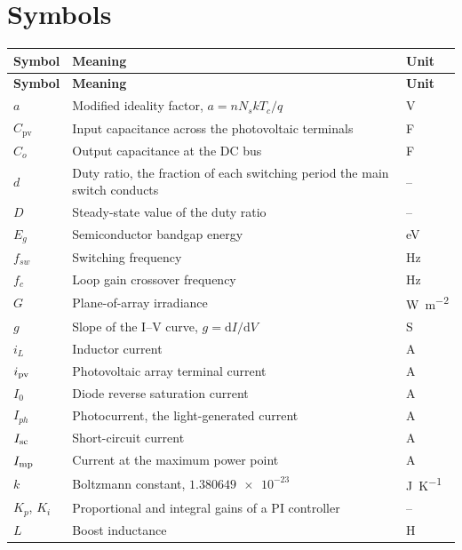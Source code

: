\section*{Symbols}

\begin{longtable}{@{}L{0.16\textwidth}L{0.62\textwidth}L{0.14\textwidth}@{}}
\toprule
\textbf{Symbol} & \textbf{Meaning} & \textbf{Unit} \\
\midrule
\endfirsthead
\toprule
\textbf{Symbol} & \textbf{Meaning} & \textbf{Unit} \\
\midrule
\endhead
\bottomrule
\endfoot

$a$ & Modified ideality factor, $a = n N_s k T_c / q$ & \si{\volt} \\
$C_{\mathrm{pv}}$ & Input capacitance across the photovoltaic terminals & \si{\farad} \\
$C_o$ & Output capacitance at the DC bus & \si{\farad} \\
$d$ & Duty ratio, the fraction of each switching period the main switch conducts & -- \\
$D$ & Steady-state value of the duty ratio & -- \\
$E_g$ & Semiconductor bandgap energy & \si{\electronvolt} \\
$f_{sw}$ & Switching frequency & \si{\hertz} \\
$f_{c}$ & Loop gain crossover frequency & \si{\hertz} \\
$G$ & Plane-of-array irradiance & \si{\watt\per\square\metre} \\
$g$ & Slope of the I--V curve, $g = \mathrm{d}I/\mathrm{d}V$ & \si{\siemens} \\
$i_L$ & Inductor current & \si{\ampere} \\
$i_{\mathrm{pv}}$ & Photovoltaic array terminal current & \si{\ampere} \\
$I_0$ & Diode reverse saturation current & \si{\ampere} \\
$I_{ph}$ & Photocurrent, the light-generated current & \si{\ampere} \\
$I_{\mathrm{sc}}$ & Short-circuit current & \si{\ampere} \\
$I_{\mathrm{mp}}$ & Current at the maximum power point & \si{\ampere} \\
$k$ & Boltzmann constant, $\num{1.380649e-23}$ & \si{\joule\per\kelvin} \\
$K_p$, $K_i$ & Proportional and integral gains of a PI controller & -- \\
$L$ & Boost inductance & \si{\henry} \\

\end{longtable}
